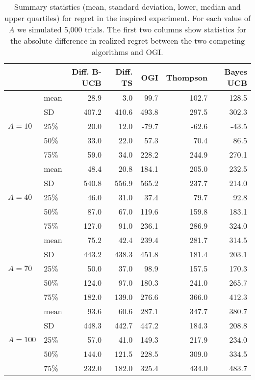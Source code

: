 \begin{table}
	\centering
	\begin{tabular}{llrrrrr}
		\toprule
		&       &  Diff. B-UCB &  Diff. TS &    OGI &  Thompson &  Bayes UCB \\
		\midrule
		& mean &           28.9 &            3.0 &    99.7 &      102.7 &      128.5 \\
		& SD &          407.2 &          410.6 &   493.8 &      297.5 &      302.3 \\
		$A = 10$& 25\% &           20.0 &           12.0 &   -79.7 &      -62.6 &      -43.5 \\
		& 50\% &           33.0 &           22.0 &    57.3 &       70.4 &       86.5 \\
		& 75\% &           59.0 &           34.0 &   228.2 &      244.9 &      270.1 \\ \hline
		& mean &           48.4 &           20.8 &   184.1 &      205.0 &      232.5 \\
		& SD &          540.8 &          556.9 &   565.2 &      237.7 &      214.0 \\
		$A = 40$& 25\% &           46.0 &           31.0 &    37.4 &       79.7 &       92.8 \\
		& 50\% &           87.0 &           67.0 &   119.6 &      159.8 &      183.1 \\
		& 75\% &          127.0 &           91.0 &   236.1 &      286.9 &      324.0 \\ \hline
		& mean &           75.2 &           42.4 &   239.4 &      281.7 &      314.5 \\
		& SD &          443.2 &          438.3 &   451.8 &      181.4 &      203.1 \\
		$A = 70$ & 25\% &           50.0 &           37.0 &    98.9 &      157.5 &      170.3 \\
		& 50\% &          124.0 &           97.0 &   180.3 &      241.0 &      265.7 \\
		& 75\% &          182.0 &          139.0 &   276.6 &      366.0 &      412.3 \\ \hline
		& mean &           93.6 &           60.6 &   287.1 &      347.7 &      380.7 \\
		& SD &          448.3 &          442.7 &   447.2 &      184.3 &      208.8 \\
		$A = 100$  & 25\% &           57.0 &           41.0 &   149.3 &      217.9 &      234.0 \\
		& 50\% &          144.0 &          121.5 &   228.5 &      309.0 &      334.5 \\
		& 75\% &          232.0 &          182.0 &   325.4 &      434.0 &      483.7 \\
		\bottomrule
	\end{tabular}
	\caption{Summary statistics (mean, standard deviation, lower, median and upper quartiles) for regret in the \cite{chapelle2011empirical} inspired experiment. For each value of $A$ we simulated 5,000 trials. The first two columns show statistics for the absolute difference in realized regret between the two competing algorithms and OGI.}
	\label{table:additional_cli_table}
\end{table}